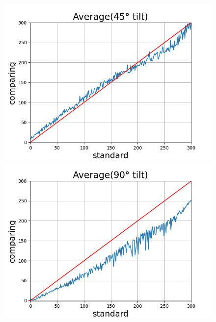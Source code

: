 \documentclass[conference]{IEEEtran}
\begin{document}
\begin{itemize}
\begin{itemize}
\begin{figure}[htbp]
\begin{minipage}[t]{0.32\textwidth}
  \end{minipage}
  \hfill
  \begin{minipage}[t]{0.32\textwidth}
    \centering
    \includegraphics[width=\textwidth]{pics/Section3/Average45.png }

  \end{minipage}
  \hfill
  \begin{minipage}[t]{0.32\textwidth}
    \centering
    \includegraphics[width=\textwidth]{pics/Section3/Average90.png}

  \end{minipage}

  \vspace{1em}


\end{figure}
\end{itemize}
\end{itemize}
\end{document}
